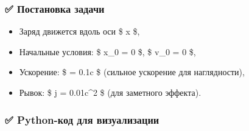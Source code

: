 \documentclass[11pt]{article}
\providecommand{\tightlist}{%
      \setlength{\itemsep}{0pt}\setlength{\parskip}{0pt}}
\begin{document}
\subsubsection{✅ Постановка
задачи}\label{ux43fux43eux441ux442ux430ux43dux43eux432ux43aux430-ux437ux430ux434ux430ux447ux438-7}

\begin{itemize}
\tightlist
\item
  Заряд движется вдоль оси \$ x \$,
\item
  Начальные условия: \$ x\_0 = 0 \$, \$ v\_0 = 0 \$,
\item
  Ускорение: \$ \Gamma = 0.1c \$ (сильное ускорение для наглядности),
\item
  Рывок: \$ j = 0.01c\^{}2 \$ (для заметного эффекта).
\end{itemize}

\subsubsection{✅ Python-код для
визуализации}\label{python-ux43aux43eux434-ux434ux43bux44f-ux432ux438ux437ux443ux430ux43bux438ux437ux430ux446ux438ux438}
\end{document}
